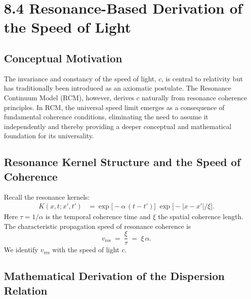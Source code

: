 \section{8.4 Resonance-Based Derivation of the Speed of Light}

\subsection{Conceptual Motivation}

The invariance and constancy of the speed of light, \(c\), is central to relativity but has traditionally been introduced as an axiomatic postulate. The Resonance Continuum Model (RCM), however, derives \(c\) naturally from resonance coherence principles. In RCM, the universal speed limit emerges as a consequence of fundamental coherence conditions, eliminating the need to assume it independently and thereby providing a deeper conceptual and mathematical foundation for its universality.

\subsection{Resonance Kernel Structure and the Speed of Coherence}

Recall the resonance kernels:
\begin{align}
  K(x,t;x',t') &= \exp\bigl[-\alpha\,(t - t')\bigr]\;\exp\bigl[-|x - x'|/\xi\bigr].
  \label{eq:kernel-structure}
\end{align}
Here \(\tau = 1/\alpha\) is the temporal coherence time and \(\xi\) the spatial coherence length.  The characteristic propagation speed of resonance coherence is
\begin{equation}
  v_{\mathrm{res}} \;=\; \frac{\xi}{\tau} \;=\; \xi\,\alpha.
  \label{eq:vres}
\end{equation}
We identify \(v_{\mathrm{res}}\) with the speed of light \(c\).

\subsection{Mathematical Derivation of the Dispersion Relation}

